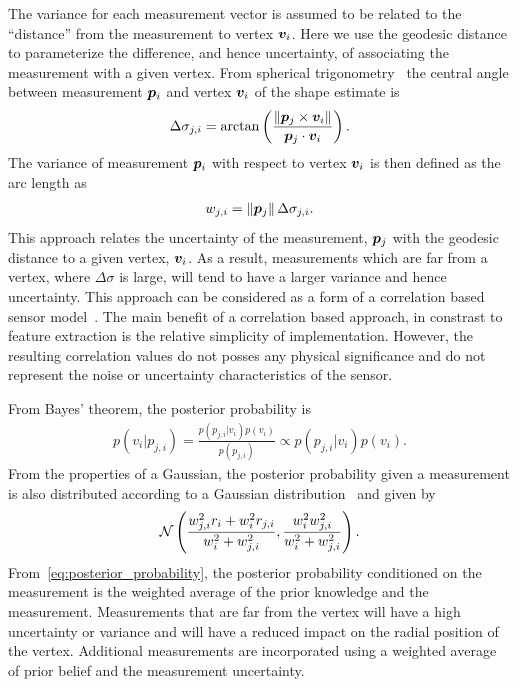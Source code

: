 The variance for each measurement vector is assumed to be related to the ``distance'' from the measurement to vertex \( \bm{v}_i \).
Here we use the \gls{geodesic} distance to parameterize the difference, and hence  uncertainty, of associating the measurement with a given vertex.
From spherical trigonometry~\cite{gade2010} the central angle between measurement \( \bm{p}_i \) and vertex \( \bm{v}_i \) of the shape estimate is
\begin{align}\label{eq:geodesic_distance}
    \Delta \sigma_{j,i} = \arctan \left( \frac{\left\| \bm{p}_j \times \bm{v}_i \right\|}{\bm{p}_j \cdot \bm{v}_i } \right).
\end{align}
The variance of measurement \( \bm{p}_i \) with respect to vertex \( \bm{v}_i \) is then defined as the arc length as
\begin{align}
    w_{j, i} = \left\| \bm{p}_j \right\| \Delta \sigma_{j,i} .
\end{align}
This approach relates the uncertainty of the measurement, \( \bm{p}_j \) with the geodesic distance to a given vertex, \( \bm{v}_i \).
As a result, measurements which are far from a vertex, where \( \Delta \sigma \) is large, will tend to have a larger variance and hence uncertainty. 
This approach can be considered as a form of a correlation based sensor model~\cite{thrun2005}.
The main benefit of a correlation based approach, in constrast to feature extraction is the relative simplicity of implementation.
However, the resulting correlation values do not posses any physical significance and do not represent the noise or uncertainty characteristics of the sensor.

From Bayes' theorem, the posterior probability is
\begin{align}
    p(v_i | p_{j, i}) = \frac{p(p_{j, i} | v_i) p(v_i)}{p( p_{j, i})} \propto p(p_{j,i} | v_i) p(v_i).
\end{align}
From the properties of a Gaussian, the posterior probability given a measurement is also distributed according to a Gaussian distribution~\cite{bishop2006} and given by
\begin{align}\label{eq:posterior_probability}
    \mathcal{N} \left( \frac{w_{j, i}^2 r_i + w_i^2 r_{j, i}}{w_i^2 + w_{j, i}^2} , \frac{w_i^2  w_{j, i}^2}{w_i^2 +  w_{j, i}^2} \right) .
\end{align}
From~\cref{eq:posterior_probability}, the posterior probability conditioned on the measurement is the weighted average of the prior knowledge and the measurement. 
Measurements that are far from the vertex will have a high uncertainty or variance and will have a reduced impact on the radial position of the vertex.
Additional measurements are incorporated using a weighted average of prior belief and the measurement uncertainty.

